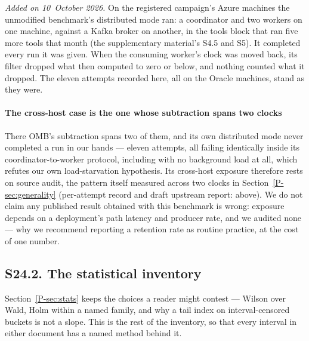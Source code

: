 \documentclass[10pt,journal,onecolumn]{IEEEtran}
\newcommand{\kafka}{Kafka}
\newcommand{\mainStats}{\ref{P-sec:stats}}           %
\newcommand{\mainGenerality}{\ref{P-sec:generality}}       %
\begin{document}
\emph{Added on 10~October 2026.} On the registered campaign's Azure machines the unmodified
benchmark's distributed mode ran: a coordinator and two workers on one machine, against a
\kafka{} broker on another, in the tools block that ran five more tools that month (the
supplementary material's S4.5 and S5). It completed every run it was given. When the consuming
worker's clock was moved back, its filter dropped what then computed to zero or below, and nothing
counted what it dropped. The eleven attempts recorded here, all on the Oracle machines, stand as
they were.


\paragraph{The cross-host case is the one whose subtraction spans two clocks} There OMB's subtraction spans two of them, and its own
distributed mode never completed a run in our hands --- eleven attempts, all failing
identically inside its coordinator-to-worker protocol, including with no background load at
all, which refutes our own load-starvation hypothesis. Its cross-host exposure therefore rests on
source audit, the pattern itself measured across two clocks in Section~\mainGenerality{} (per-attempt record and draft upstream report:
above). We do not claim any published result obtained with this
benchmark is wrong: exposure depends on a deployment's path latency and producer rate,
and we audited none --- why we recommend reporting a retention rate as routine practice,
at the cost of one number.

\subsection{S24.2. The statistical inventory}
\label{sec:inventory}

Section~\mainStats{} keeps the choices a reader might contest --- Wilson over Wald, Holm
within a named family, and why a tail index on interval-censored buckets is not a slope. This
is the rest of the inventory, so that every interval in either document has a named method
behind it.
\end{document}
